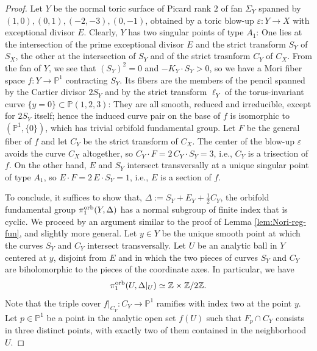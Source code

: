 \documentclass{amsart}
\newcommand{\pp}{\mathbb{P}}
\newcommand{\zz}{\mathbb{Z}}
\theoremstyle{definition}
\theoremstyle{remark}
\numberwithin{equation}{section}
\begin{document}
\begin{proof}

Let $Y$ be the normal toric surface of Picard rank $2$ of fan $\Sigma_Y$ spanned by $(1,0),(0,1),(-2,-3),(0,-1)$, obtained by a toric blow-up $\varepsilon:Y\to X$ with exceptional divisor $E$. Clearly, $Y$ has two singular points of type $A_1$: One lies at the intersection of the prime exceptional divisor $E$ and the strict transform $S_Y$ of $S_X$, the other at the intersection of $S_Y$ and of the strict trasnform $C_Y$ of $C_X$. From the fan of $Y$, we see that $(S_Y)^2=0$ and $-K_Y\cdot S_Y > 0$, so we have a Mori fiber space $f:Y\to\mathbb{P}^1$ contracting $S_Y$. Its fibers are the members of the pencil spanned by the Cartier divisor $2S_Y$ and by the strict transform $\ell_Y$ of the torus-invariant curve $\{y=0\}\subset \pp(1,2,3)$: They are all smooth, reduced and irreducible, except for $2S_Y$ itself; hence the induced curve pair on the base of $f$ is isomorphic to $(\pp^1,\{0\})$, which has trivial orbifold fundamental group.
Let $F$ be the general fiber of $f$ and let $C_Y$ be the strict transform of $C_X$. 
The center of the blow-up $\varepsilon$ avoids the curve $C_X$ altogether, so $C_Y\cdot F = 2\,  C_Y\cdot S_Y = 3$, i.e., $C_Y$ is a trisection of $f$. On the other hand, $E$ and $S_Y$ intersect transversally at a unique singular point of type $A_1$, so $E\cdot F = 2\,  E\cdot S_Y = 1$, i.e., $E$ is a section of $f$. 

To conclude, it suffices to show that, $\Delta:=S_Y+E_Y+\frac{1}{2}C_Y$, the orbifold fundamental group
$\pi_1^{\rm orb}(Y,\Delta)$ has a normal subgroup of finite index that is cyclic. We proceed by an argument similar to the proof of Lemma \ref{lem:Nori-reg-fun}, and slightly more general. Let $y\in Y$ be the unique smooth point at which the curves $S_Y$ and $C_Y$ intersect transversally. Let $U$ be an analytic ball in $Y$ centered at $y$, disjoint from $E$ and in which the two pieces of curves $S_Y$ and $C_Y$ are biholomorphic to the pieces of the coordinate axes. In particular, we have
\begin{equation}\label{eq:pi1U}
\pi_1^{\rm orb}(U,\Delta|_{U})\simeq \zz\times\zz/2\zz.
\end{equation}
Note that the triple cover $f|_{C_Y}:C_Y\to \pp^1$ ramifies with index two at the point $y$.
Let $p\in\pp^1$ be a point in the analytic open set $f(U)$ such that $F_p\cap C_Y$ consists in three distinct points, with exactly two of them contained in the neighborhood $U$.


\end{proof}
\end{document}

